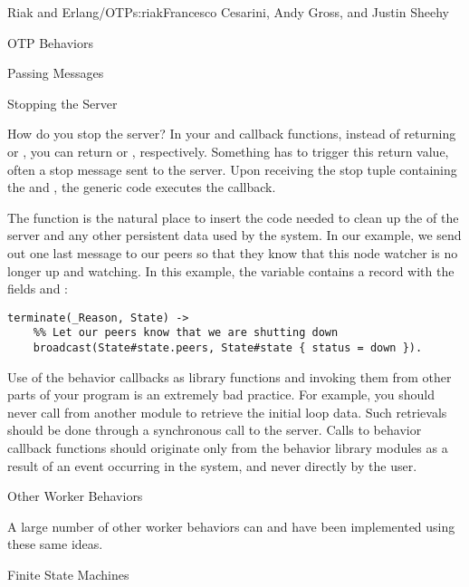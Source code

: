 \begin{aosachapter}{Riak and Erlang/OTP}{s:riak}{Francesco Cesarini, Andy Gross, and Justin Sheehy}
\begin{aosasect1}{OTP Behaviors}
\begin{aosasect2}{Passing Messages}
\end{aosasect2}

\begin{aosasect2}{Stopping the Server}

How do you stop the server? In your  and
 callback functions, instead of returning
 or , you
can return  or , respectively. Something has to trigger this
return value, often a stop message sent to the server. Upon
receiving the stop tuple containing the  and
, the generic code executes the  callback.

The  function is the natural place to insert the code
needed to clean up the  of the server and any other
persistent data used by the system. In our example, we send out one
last message to our peers so that they know that this node watcher is
no longer up and watching. In this example, the variable 
contains a record with the fields  and :

\begin{verbatim}
terminate(_Reason, State) ->
    %% Let our peers know that we are shutting down
    broadcast(State#state.peers, State#state { status = down }).
\end{verbatim}

Use of the behavior callbacks as library functions and invoking them
from other parts of your program is an extremely bad practice. For
example, you should never call
 from another module to
retrieve the initial loop data. Such retrievals should be done through
a synchronous call to the server. Calls to behavior callback functions
should originate only from the behavior library modules as a result of
an event occurring in the system, and never directly by the user.

\end{aosasect2}

\end{aosasect1}

\begin{aosasect1}{Other Worker Behaviors}

A large number of other worker behaviors can and have been implemented
using these same ideas.

\begin{aosasect2}{Finite State Machines}


\end{aosasect2}
\end{aosasect1}
\end{aosachapter}
